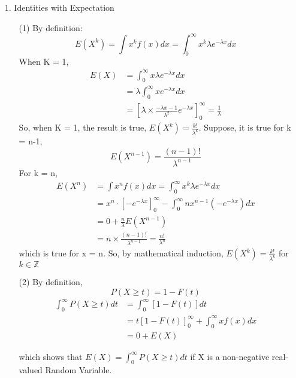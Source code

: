 \documentclass[a4paper,12pt]{article}
\begin{document}
\begin{enumerate}
\item[1.]  Identities with Expectation \\

\begin{itemize}
\item[(1)] 
By definition:
$$
E(X^k) = \int x^k f(x) dx = \int_0^{\infty} x^k \lambda e^{-\lambda x} dx
$$
When K = 1,
\begin{align*}
E(X) &= \int_0^{\infty} x \lambda e^{-\lambda x} dx  \\
         &=\lambda \int_0^{\infty} x e^{-\lambda x}  dx\\
         &= \left [ \lambda \times \frac{-\lambda x - 1}{ \lambda^2} e^{-\lambda x} \right ]_0^{\infty} = \frac{1}{\lambda}
\end{align*}
So, when K = 1, the result is true, $E(X^k) = \frac{k !}{\lambda^k}$. Suppose, it is true for k = n-1,
$$
E(X^{n-1}) = \frac{(n-1)!}{\lambda^{n-1}}
$$
For k = n,
\begin{align*}
E(X^{n}) &= \int x^n f(x) dx = \int_0^{\infty} x^k \lambda e^{-\lambda x} dx \\
               &= x^n \cdot \left [-e^{-\lambda x} \right]_0^{\infty} - \int_{0}^{\infty} n x^{n-1} (-e^{-\lambda x}) dx \\
               &= 0 + \frac{n}{\lambda} E(X^{n-1}) \\
               &= n \times \frac{(n-1)!}{\lambda^{n-1}} = \frac{n!}{\lambda^n}
\end{align*}
which is true for x = n. So, by mathematical induction, $ E(X^k) = \frac{k!}{\lambda^k}$ for $k \in \mathbb{Z}$

\clearpage
\item[(2)]
By definition,
$$
P (X \ge t) = 1 - F(t)
$$
\begin{align*}
\int_{0}^{\infty}  P (X \ge t)  dt &= \int_{0}^{\infty}  [1 - F(t)]  dt \\
							 &= t \left [1 - F(t) \right ]_0^{\infty} + \int_0^{\infty} x f(x) dx \\
							 &= 0 + E(X)
\end{align*}

which shows that $E(X) = \int_{0}^{\infty}  P (X \ge t)  dt $ if X is a non-negative real-valued Random Variable.


\end{itemize}
\end{enumerate}
\end{document}
